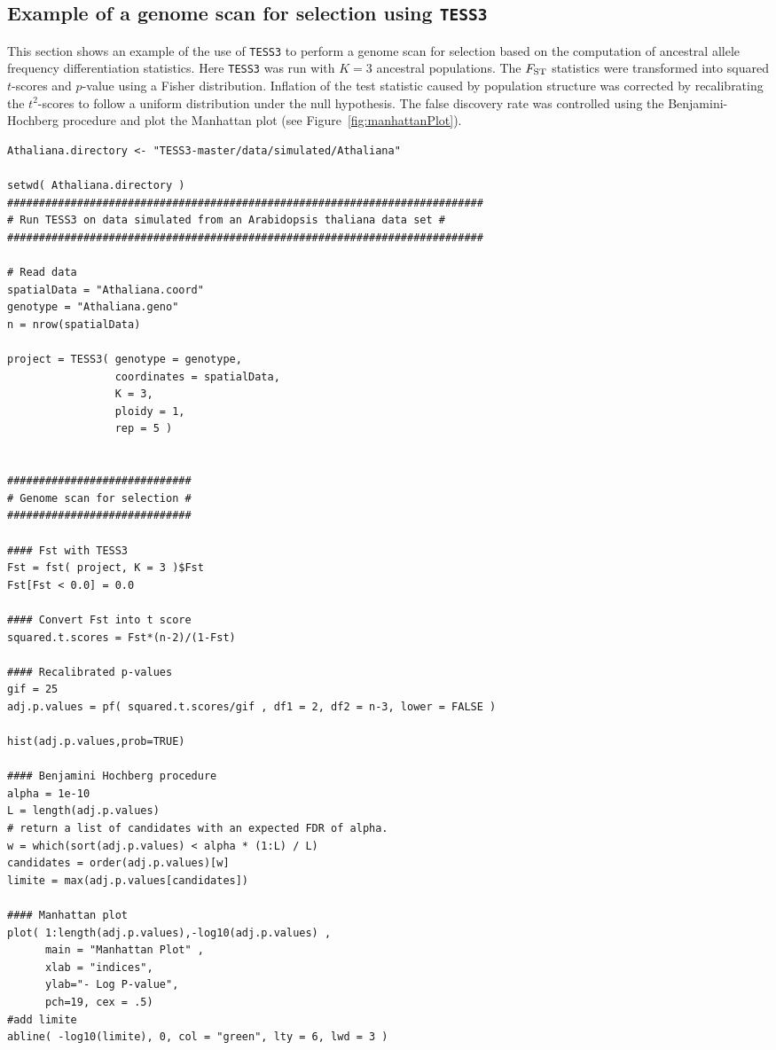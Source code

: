 \documentclass[10pt,a4paper]{article}
\begin{document}
\subsection{Example of a genome scan for selection using {\tt TESS3}}
This section shows an example of the use of {\tt TESS3} to perform a genome scan for selection based on the computation of ancestral allele frequency differentiation statistics. Here {\tt TESS3} was run with $K = 3$ ancestral populations. The $F_{\rm ST}$ statistics were transformed into squared $t$-scores and $p$-value using a Fisher distribution. Inflation of the test statistic caused by population structure was corrected by recalibrating the $t^2$-scores to follow a uniform distribution under the null hypothesis. The false discovery rate was controlled using the Benjamini-Hochberg procedure and plot the Manhattan plot (see Figure~\ref{fig:manhattanPlot}).


\newpage

\begin{Verbatim}[frame=single]
Athaliana.directory <- "TESS3-master/data/simulated/Athaliana"

setwd( Athaliana.directory )
###########################################################################
# Run TESS3 on data simulated from an Arabidopsis thaliana data set #
###########################################################################

# Read data
spatialData = "Athaliana.coord"
genotype = "Athaliana.geno"
n = nrow(spatialData)

project = TESS3( genotype = genotype, 
                 coordinates = spatialData, 
                 K = 3, 
                 ploidy = 1, 
                 rep = 5 )


#############################
# Genome scan for selection #
#############################

#### Fst with TESS3 
Fst = fst( project, K = 3 )$Fst
Fst[Fst < 0.0] = 0.0

#### Convert Fst into t score
squared.t.scores = Fst*(n-2)/(1-Fst)

#### Recalibrated p-values
gif = 25
adj.p.values = pf( squared.t.scores/gif , df1 = 2, df2 = n-3, lower = FALSE )

hist(adj.p.values,prob=TRUE)

#### Benjamini Hochberg procedure
alpha = 1e-10
L = length(adj.p.values)
# return a list of candidates with an expected FDR of alpha.
w = which(sort(adj.p.values) < alpha * (1:L) / L)
candidates = order(adj.p.values)[w]
limite = max(adj.p.values[candidates])

#### Manhattan plot 
plot( 1:length(adj.p.values),-log10(adj.p.values) , 
      main = "Manhattan Plot" , 
      xlab = "indices", 
      ylab="- Log P-value", 
      pch=19, cex = .5) 
#add limite
abline( -log10(limite), 0, col = "green", lty = 6, lwd = 3 )
\end{Verbatim}
\end{document}
